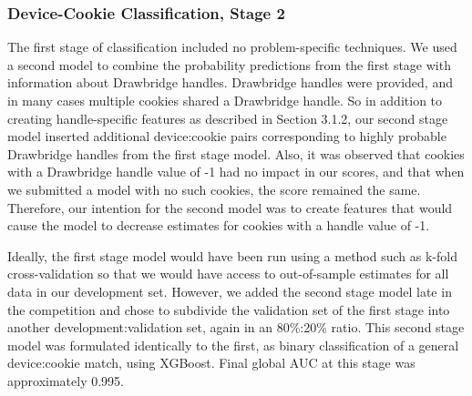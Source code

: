 \documentclass[9pt, journal]{IEEEtran}
\begin{document}


\subsubsection{Device-Cookie Classification, Stage 2}
The first stage of classification included no problem-specific techniques.
We used a second model to combine the probability predictions from the first stage with information about Drawbridge handles.
Drawbridge handles were provided, and in many cases multiple cookies shared a Drawbridge handle. 
So in addition to creating handle-specific features as described in Section 3.1.2, our second stage model inserted additional device:cookie pairs corresponding to highly probable Drawbridge handles from the first stage model. 
Also, it was observed that cookies with a Drawbridge handle value of -1 had no impact in our scores, and that when we submitted a model with no such cookies, the score remained the same.
Therefore, our intention for the second model was to create features that would cause the model to decrease estimates for cookies with a handle value of -1.

Ideally, the first stage model would have been run using a method such as k-fold cross-validation so that we would have access to out-of-sample estimates for all data in our development set.
However, we added the second stage model late in the competition and chose to subdivide the validation set of the first stage into another development:validation set, again in an 80\%:20\% ratio.
This second stage model was formulated identically to the first, as binary classification of a general device:cookie match, using XGBoost. 
Final global AUC at this stage was approximately 0.995. 
\end{document}
